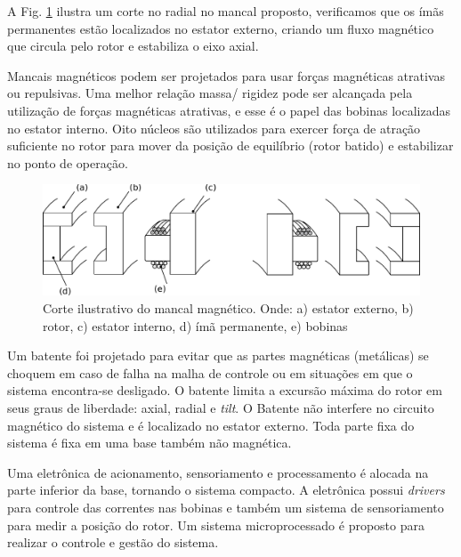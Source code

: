 A Fig. \ref{fig:mancal:corte} ilustra um corte no radial no mancal proposto, verificamos que os ímãs permanentes estão localizados no estator externo, criando um fluxo magnético que circula pelo rotor e estabiliza o eixo axial.

Mancais magnéticos podem ser projetados para usar forças magnéticas atrativas ou repulsivas. Uma melhor relação massa/ rigidez pode ser alcançada pela utilização de forças magnéticas atrativas, e esse é o papel das bobinas localizadas no estator interno. Oito núcleos são utilizados para exercer força de atração suficiente no rotor para mover da posição de equilíbrio (rotor batido) e estabilizar no ponto de operação. 

\begin{figure}[ht!]
	\centering
	\includegraphics[width=1\linewidth]{./Figs/mancais/mancal_corte}
	\caption[Corte ilustrativo do mancal magnético]{Corte ilustrativo do mancal magnético. Onde: a) estator externo, b) rotor, c) estator interno, d) ímã permanente, e) bobinas}
	\label{fig:mancal:corte}
\end{figure}

Um batente foi projetado para evitar que as partes magnéticas (metálicas) se choquem em caso de falha na malha de controle ou em situações em que o sistema encontra-se desligado. O batente limita a excursão máxima do rotor em seus graus de liberdade: axial, radial e \textit{tilt}. O Batente não interfere no circuito magnético do sistema e é localizado no estator externo. Toda parte fixa do sistema é fixa em uma base também não magnética.

Uma eletrônica de acionamento, sensoriamento e processamento é alocada na parte inferior da base, tornando o sistema compacto. A eletrônica possui \textit{drivers} para controle das correntes nas bobinas e também um sistema de sensoriamento para medir a posição do rotor. Um sistema microprocessado é proposto para realizar o controle e gestão do sistema.

%

